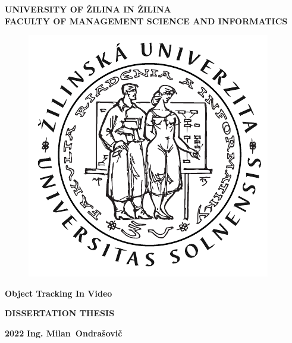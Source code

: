 \begin{titlepage}
    \begin{center}
        \vspace*{1cm} %

        \normalsize
        \textbf{UNIVERSITY OF ŽILINA IN ŽILINA}\\
        \textbf{FACULTY OF MANAGEMENT SCIENCE AND INFORMATICS}\\

        \begin{figure}[!h]
            \centerline{\includegraphics[width=0.25\linewidth]{figures/formal_pages/FRI_logo.pdf}}
        \end{figure}

        \vspace{5cm}

        \LARGE
        \textbf{Object Tracking In Video}

        \vspace{1cm}

        \Large
        \textbf{DISSERTATION THESIS}
    \end{center}

    \vspace{2cm}

    \vfill

    \normalsize

    \vspace{2cm}

    \textbf{2022} \hfill \textbf{Ing. Milan~Ondra\v{s}ovi\v{c}}

\end{titlepage}
